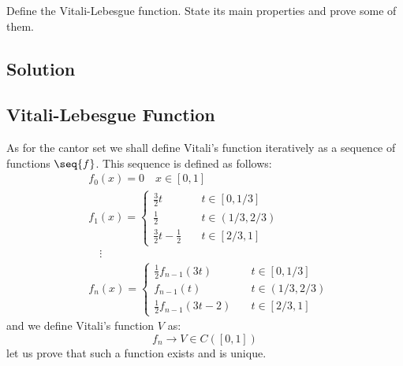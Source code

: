 
\question

Define the Vitali-Lebesgue function. State its main properties and prove some of 
them.

\subsection*{Solution}

\subsection{Vitali-Lebesgue Function}
As for the cantor set we shall define Vitali's function iteratively as a sequence of functions $\seq{f}$. This sequence is defined as follows:
\begin{align*}
    & f_0(x) = 0 \quad x\in [0,1] \\
    & f_1(x) = \begin{cases}
        \frac{3}{2}t \quad & t\in [0,1/3] \\
        \frac{1}{2} \quad & t\in (1/3,2/3) \\
        \frac{3}{2}t - \frac{1}{2} \quad & t\in [2/3,1]
    \end{cases} \\
    & \quad \vdots \\
    & f_{n}(x) = \begin{cases}
        \frac{1}{2}f_{n-1}(3t) \quad & t\in [0,1/3] \\
        f_{n-1}(t) \quad & t\in (1/3,2/3) \\
        \frac{1}{2}f_{n-1}(3t - 2) \quad & t\in [2/3,1]
    \end{cases}
\end{align*}
and we define Vitali's function $V$ as:
\[
    f_n \to V \in C([0,1])    
\]
let us prove that such a function exists and is unique.

